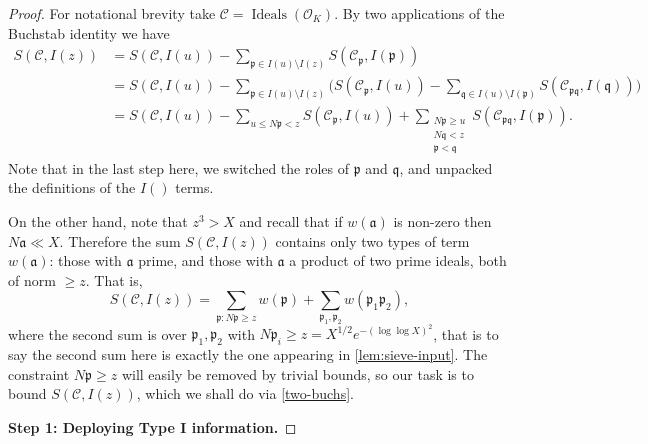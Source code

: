 \documentclass[11pt,reqno]{amsart}
\numberwithin{equation}{section}
\theoremstyle{definition}
\theoremstyle{remark}
\newcommand{\mc}{\mathcal}
\newcommand{\mf}{\mathfrak}
\renewcommand{\le}{\leqslant}
\renewcommand{\ge}{\geqslant}
\newcommand\Ideals{\operatorname{Ideals}}
\renewcommand\O{\mathcal{O}}
\begin{document}
\begin{proof}
For notational brevity take $\mc{C}= \Ideals(\O_K)$. By two applications of the Buchstab identity we have
\begin{align} \nonumber
S(\mc{C},I(z)) &= S(\mc{C},I(u)) - \sum_{\mf{p} \in I(u) \setminus I(z)}S(\mc{C}_\mf{p},I(\mf{p}))\\
& \nonumber =S(\mc{C},I(u)) - \sum_{\mf{p} \in I(u) \setminus I(z)}\bigg(S(\mc{C}_\mf{p},I(u))-\sum_{\mf{q} \in I(u) \setminus I(\mf{p})}
S(\mc{C}_{\mf{p}\mf{q}},I(\mf{q}))\bigg)\\
& \label{two-buchs} =S(\mc{C},I(u)) - \sum_{u \le N\mf{p} < z}S(\mc{C}_\mf{p},I(u)) + \sum_{\substack{N\mf{p} \ge u \\ N\mf{q} < z \\ \mf{p} < \mf{q}}}S(\mc{C}_{\mf{p}\mf{q}},I(\mf{p})).
\end{align}
Note that in the last step here, we switched the roles of $\mf{p}$ and $\mf{q}$, and unpacked the definitions of the $I()$ terms.

On the other hand, note that $z^{3}>X$ and recall that if $w(\mf{a})$ is non-zero then $N\mf{a} \ll X$. Therefore the sum $S(\mc{C}, I(z))$ contains only two types of term $w(\mf{a})$: those with $\mf{a}$ prime, and those with $\mf{a}$ a product of two prime ideals, both of norm $\ge z$. That is,
\begin{equation}\label{sieved-sum} S(\mc{C},I(z)) = \sum_{\mf{p}: N\mf{p}\ge z} w(\mf{p}) + \sum_{\mf{p}_1,\mf{p}_2} w(\mf{p}_1\mf{p}_2),\end{equation}
where the second sum is over $\mf{p}_1,\mf{p}_2$ with $N\mf{p}_i \ge z = X^{1/2} e^{-(\log\log X)^2}$, that is to say the second sum here is exactly the one appearing in \cref{lem:sieve-input}. The constraint $N\mf{p} \ge z$ will easily be removed by trivial bounds, so our task is to bound $S(\mc{C}, I(z))$, which we shall do via \cref{two-buchs}.\vspace*{8pt}


\textbf{Step 1: Deploying Type I information.}


\end{proof}
\end{document}
